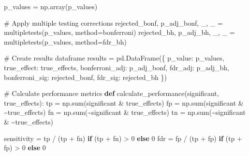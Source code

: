 \documentclass[
  11pt,
  letterpaper,
  oneside]{book}
\newenvironment{Shaded}{\begin{snugshade}}{\end{snugshade}}
\newcommand{\BuiltInTok}[1]{\textcolor[rgb]{0.00,0.23,0.31}{#1}}
\newcommand{\CommentTok}[1]{\textcolor[rgb]{0.37,0.37,0.37}{#1}}
\newcommand{\ControlFlowTok}[1]{\textcolor[rgb]{0.00,0.23,0.31}{\textbf{#1}}}
\newcommand{\DecValTok}[1]{\textcolor[rgb]{0.68,0.00,0.00}{#1}}
\newcommand{\KeywordTok}[1]{\textcolor[rgb]{0.00,0.23,0.31}{\textbf{#1}}}
\newcommand{\NormalTok}[1]{\textcolor[rgb]{0.00,0.23,0.31}{#1}}
\newcommand{\OperatorTok}[1]{\textcolor[rgb]{0.37,0.37,0.37}{#1}}
\newcommand{\StringTok}[1]{\textcolor[rgb]{0.13,0.47,0.30}{#1}}
\begin{document}
\begin{Shaded}
\begin{Highlighting}[]
\NormalTok{p\_values }\OperatorTok{=}\NormalTok{ np.array(p\_values)}

\CommentTok{\# Apply multiple testing corrections}
\NormalTok{rejected\_bonf, p\_adj\_bonf, \_, \_ }\OperatorTok{=}\NormalTok{ multipletests(p\_values, method}\OperatorTok{=}\StringTok{\textquotesingle{}bonferroni\textquotesingle{}}\NormalTok{)}
\NormalTok{rejected\_bh, p\_adj\_bh, \_, \_ }\OperatorTok{=}\NormalTok{ multipletests(p\_values, method}\OperatorTok{=}\StringTok{\textquotesingle{}fdr\_bh\textquotesingle{}}\NormalTok{)}

\CommentTok{\# Create results dataframe}
\NormalTok{results }\OperatorTok{=}\NormalTok{ pd.DataFrame(\{}
    \StringTok{\textquotesingle{}p\_value\textquotesingle{}}\NormalTok{: p\_values,}
    \StringTok{\textquotesingle{}true\_effect\textquotesingle{}}\NormalTok{: true\_effects,}
    \StringTok{\textquotesingle{}bonferroni\_adj\textquotesingle{}}\NormalTok{: p\_adj\_bonf,}
    \StringTok{\textquotesingle{}fdr\_adj\textquotesingle{}}\NormalTok{: p\_adj\_bh,}
    \StringTok{\textquotesingle{}bonferroni\_sig\textquotesingle{}}\NormalTok{: rejected\_bonf,}
    \StringTok{\textquotesingle{}fdr\_sig\textquotesingle{}}\NormalTok{: rejected\_bh}
\NormalTok{\})}

\CommentTok{\# Calculate performance metrics}
\KeywordTok{def}\NormalTok{ calculate\_performance(significant, true\_effects):}
\NormalTok{    tp }\OperatorTok{=}\NormalTok{ np.}\BuiltInTok{sum}\NormalTok{(significant }\OperatorTok{\&}\NormalTok{ true\_effects)}
\NormalTok{    fp }\OperatorTok{=}\NormalTok{ np.}\BuiltInTok{sum}\NormalTok{(significant }\OperatorTok{\&} \OperatorTok{\textasciitilde{}}\NormalTok{true\_effects)}
\NormalTok{    fn }\OperatorTok{=}\NormalTok{ np.}\BuiltInTok{sum}\NormalTok{(}\OperatorTok{\textasciitilde{}}\NormalTok{significant }\OperatorTok{\&}\NormalTok{ true\_effects)}
\NormalTok{    tn }\OperatorTok{=}\NormalTok{ np.}\BuiltInTok{sum}\NormalTok{(}\OperatorTok{\textasciitilde{}}\NormalTok{significant }\OperatorTok{\&} \OperatorTok{\textasciitilde{}}\NormalTok{true\_effects)}

\NormalTok{    sensitivity }\OperatorTok{=}\NormalTok{ tp }\OperatorTok{/}\NormalTok{ (tp }\OperatorTok{+}\NormalTok{ fn) }\ControlFlowTok{if}\NormalTok{ (tp }\OperatorTok{+}\NormalTok{ fn) }\OperatorTok{\textgreater{}} \DecValTok{0} \ControlFlowTok{else} \DecValTok{0}
\NormalTok{    fdr }\OperatorTok{=}\NormalTok{ fp }\OperatorTok{/}\NormalTok{ (tp }\OperatorTok{+}\NormalTok{ fp) }\ControlFlowTok{if}\NormalTok{ (tp }\OperatorTok{+}\NormalTok{ fp) }\OperatorTok{\textgreater{}} \DecValTok{0} \ControlFlowTok{else} \DecValTok{0}


\end{Highlighting}
\end{Shaded}
\end{document}
